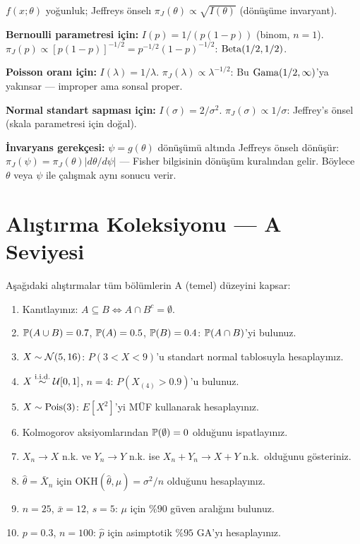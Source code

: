 \begin{ornek}
$f(x;\theta)$ yoğunluk; Jeffreys önselı $\pi_J(\theta)\propto\sqrt{I(\theta)}$ (dönüşüme invaryant).

\textbf{Bernoulli parametresi için:} $I(p)=1/(p(1-p))$ (binom, $n=1$).
$\pi_J(p)\propto [p(1-p)]^{-1/2}=p^{-1/2}(1-p)^{-1/2}$: $\operatorname{Beta}(1/2,1/2)$.

\textbf{Poisson oranı için:} $I(\lambda)=1/\lambda$.
$\pi_J(\lambda)\propto\lambda^{-1/2}$: Bu $\operatorname{Gama}(1/2,\infty)$'ya yakınsar --- improper ama sonsal proper.

\textbf{Normal standart sapması için:} $I(\sigma)=2/\sigma^2$.
$\pi_J(\sigma)\propto 1/\sigma$: Jeffrey's önsel (skala parametresi için doğal).

\textbf{İnvaryans gerekçesi:} $\psi=g(\theta)$ dönüşümü altında Jeffreys önselı dönüşür: $\pi_J(\psi)=\pi_J(\theta)|d\theta/d\psi|$ --- Fisher bilgisinin dönüşüm kuralından gelir. Böylece $\theta$ veya $\psi$ ile çalışmak aynı sonucu verir.
\end{ornek}

\section{Alıştırma Koleksiyonu --- A Seviyesi}
\label{app:A_seviye}

Aşağıdaki alıştırmalar tüm bölümlerin A (temel) düzeyini kapsar:

\begin{enumerate}[label=\textbf{G.\arabic*.}]
  \item Kanıtlayınız: $A\subseteq B\iff A\cap B^c=\emptyset$.
  \item $\mathbb{P}(A\cup B)=0.7$, $\mathbb{P}(A)=0.5$, $\mathbb{P}(B)=0.4$: $\mathbb{P}(A\cap B)$'yi bulunuz.
  \item $X\sim\mathcal{N}(5,16)$: $P(3<X<9)$'u standart normal tablosuyla hesaplayınız.
  \item $X\overset{\text{i.i.d.}}{\sim}\mathcal{U}[0,1]$, $n=4$: $P(X_{(4)}>0.9)$'u bulunuz.
  \item $X\sim\operatorname{Pois}(3)$: $E[X^2]$'yi MÜF kullanarak hesaplayınız.
  \item Kolmogorov aksiyomlarından $\mathbb{P}(\emptyset)=0$ olduğunu ispatlayınız.
  \item $X_n\to X$ n.k. ve $Y_n\to Y$ n.k. ise $X_n+Y_n\to X+Y$ n.k.\ olduğunu gösteriniz.
  \item $\hat\theta=\bar X_n$ için $\mathrm{OKH}(\hat\theta,\mu)=\sigma^2/n$ olduğunu hesaplayınız.
  \item $n=25$, $\bar x=12$, $s=5$: $\mu$ için $\%90$ güven aralığını bulunuz.
  \item $p=0.3$, $n=100$: $\hat p$ için asimptotik $\%95$ GA'yı hesaplayınız.
\end{enumerate}

